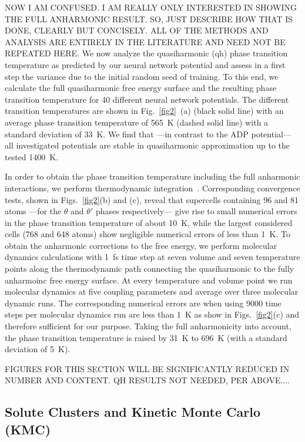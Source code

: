 \documentclass{article}
\begin{document}
NOW I AM CONFUSED.  I AM REALLY ONLY INTERESTED IN SHOWING THE FULL ANHARMONIC RESULT. SO, JUST DESCRIBE HOW THAT IS DONE, CLEARLY BUT CONCISELY. ALL OF THE METHODS AND ANALYSIS ARE ENTIRELY IN THE LITERATURE AND NEED NOT BE REPEATED HERE. 
We now analyze the quasiharmonic (qh) phase transition temperature as predicted by our neural network potential and assess in a first step the variance due to the initial random seed of training. To this end, we calculate the full quasiharmonic free energy surface and the resulting phase transition temperature for 40 different neural network potentials. The different transition temperatures are shown in Fig.~\ref{fig2}~(a) (black solid line) with an average phase transition temperature of 565~K (dashed solid line) with a standard deviation of 33~K. We find that ---in contrast to the ADP potential--- all investigated potentials are stable in quasiharmonic approximation up to the tested 1400~K. 

In order to obtain the phase transition temperature including the full anharmonic interactions, we perform thermodynamic integration~\cite{Grabowski2009,Glensk2015}. Corresponding convergence tests, shown in Figs.~\ref{fig2}(b) and (c), reveal that supercells containing 96 and 81 atoms ---for the $\theta$ and $\theta'$ phases respectively--- give rise to small numerical errors in the phase transition temperature of about 10~K, while the largest considered cells (768 and 648 atoms) show negligible numerical errors of less than 1~K. To obtain the anharmonic corrections to the free energy, we perform molecular dynamics calculations with 1~fs time step at seven volume and seven temperature points along the thermodynamic path connecting the quasiharmonic to the fully anharmoinc free energy surface. At every temperature and volume point we run molecular dynamics at five coupling parameters and average over three molecular dynamic runs. The corresponding numerical errors are when using 9000 time steps per molecular dynamics run are less than 1~K as show in Figs.~\ref{fig2}(c) and therefore sufficient for our purpose. Taking the full anharmonicity into account, the phase transition temperature is raised by 31~K to 696~K (with a standard deviation of 5~K).

FIGURES FOR THIS SECTION WILL BE SIGNIFICANTLY REDUCED IN NUMBER AND CONTENT.  QH RESULTS NOT NEEDED, PER ABOVE....


\subsection{Solute Clusters and Kinetic Monte Carlo (KMC)} \label{sct:solute_clusters_KMC}
\end{document}
